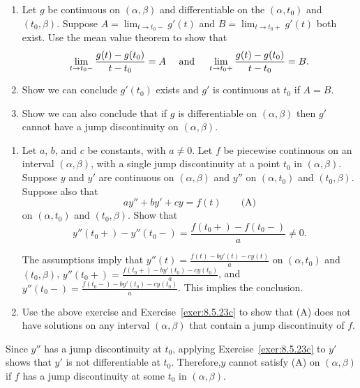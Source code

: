 \documentclass{ximera}
\begin{document}
\begin{problem}\label{exer:8.5.23}
\begin{enumerate}
\item %
Let $g$ be  continuous on  $(\alpha,\beta)$
 and differentiable on the  $(\alpha,t_0)$
and $(t_0,\beta)$. Suppose $A=\lim_{t\to t_0-}g'(t)$
and $B=\lim_{t\to t_0+}g'(t)$ both exist. Use the mean value theorem
to show that
$$
\lim_{t\to t_0-}{g(t)-g(t_0)\over t-t_0}=A\quad\mbox{ and }\quad
\lim_{t\to t_0+}\frac{g(t)-g(t_0)}{t-t_0}=B.
$$
\item %
Show we can conclude $g'(t_0)$ exists and $g'$ is continuous at
$t_0$ if $A=B$.

\item\label{exer:8.5.23c} %
Show we can also conclude
 that if $g$  is differentiable on $(\alpha,\beta)$ then
$g'$ cannot have a jump discontinuity on $(\alpha,\beta)$.
\end{enumerate}
\end{problem}

\begin{problem}\label{exer:8.5.24}
\begin{enumerate}
\item %
Let $a$, $b$, and $c$ be constants, with $a\ne0$. Let $f$ be piecewise
continuous on an interval $(\alpha,\beta)$, with a single jump
discontinuity at a point $t_0$ in $(\alpha,\beta)$. Suppose $y$
and $y'$ are continuous on $(\alpha,\beta)$ and $y''$ on
$(\alpha,t_0)$ and $(t_0,\beta)$. Suppose  also that
$$
ay''+by'+cy=f(t) \quad
\quad\text{(A)}
$$
on $(\alpha,t_0)$ and $(t_0,\beta)$.
Show that
$$
y''(t_0+)-y''(t_0-)=\frac{f(t_0+)-f(t_0-)}{a}\ne0.
$$

\begin{solution}
The assumptions imply that
$y''(t)=\frac{f(t)-by'(t)-cy(t)}{a}$  on $(\alpha,t_0)$
and $(t_0,\beta)$,
$y''(t_0+)=\frac{f(t_0+)-by'(t_0)-cy(t_0)}{a}$, and
$y''(t_0-)=\frac{f(t_0-)-by'(t_0)-cy(t_0)}{a}$. This implies the conclusion.
\end{solution}

\item %
Use the above exercise and Exercise~\ref{exer:8.5.23c} to show that
(A)
does not  have  solutions on any interval $(\alpha,\beta)$ that contain a jump discontinuity of $f$.
\end{enumerate}

\begin{solution}
Since $y''$ has a jump discontinuity at $t_0$, applying
Exercise~\ref{exer:8.5.23c} to $y'$  shows that $y'$
is not differentiable at $t_0$. Therefore,$y$ cannot satisfy
(A) on $(\alpha,\beta)$ if $f$ has a jump discontinuity at some
$t_0$ in $(\alpha,\beta)$.
\end{solution}
\end{problem}
\end{document}
